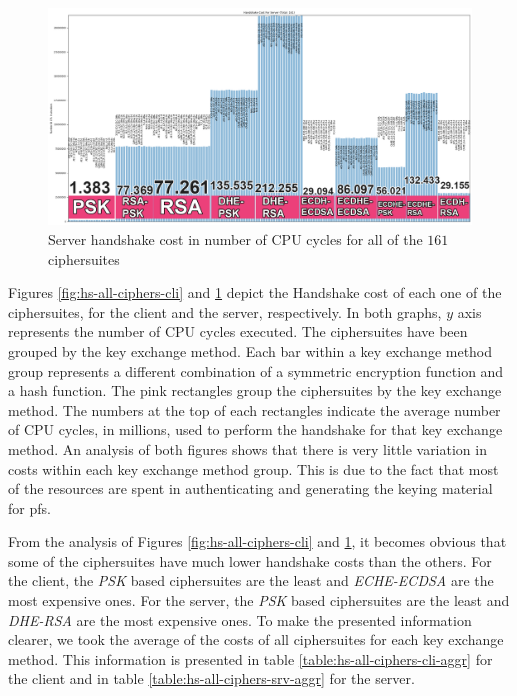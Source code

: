 \begin{figure}
  \centering
  \includegraphics[width=1.0\textwidth]{img/hs_cost_srv.png}
  \centering \caption{\label{fig:hs-all-ciphers-srv} Server handshake cost in number of CPU cycles for all of the $161$ ciphersuites}
\end{figure}

Figures \ref{fig:hs-all-ciphers-cli} and \ref{fig:hs-all-ciphers-srv} depict the Handshake cost of each one
of the ciphersuites, for the client and the server, respectively. In both graphs, $y$ axis represents the number of
CPU cycles executed. The ciphersuites have been grouped by the key exchange method. Each bar within a key
exchange method group represents a different combination of a symmetric encryption function and a hash function.
The pink rectangles group the ciphersuites by the key exchange method. The numbers at the top of each rectangles indicate the average
number of CPU  cycles, in millions, used to perform the handshake for that key exchange method.
An analysis of both figures shows that there is very little variation in costs within
each key exchange method group. This is due to the fact that most of the resources are spent in authenticating and
generating the keying material for \gls{pfs}.

From the analysis of Figures \ref{fig:hs-all-ciphers-cli} and \ref{fig:hs-all-ciphers-srv}, it becomes obvious
that some of the ciphersuites have  much lower handshake costs than the others. For the client, the \textit{PSK} based
ciphersuites are the least and \textit{ECHE-ECDSA} are the most expensive ones. For the server, the \textit{PSK} based
ciphersuites are the least and \textit{DHE-RSA} are the most expensive ones. To make the presented information clearer,
we took the average of the costs of all ciphersuites for each key exchange method. This information is presented in
table \ref{table:hs-all-ciphers-cli-aggr} for the client and in table \ref{table:hs-all-ciphers-srv-aggr} for the server.

